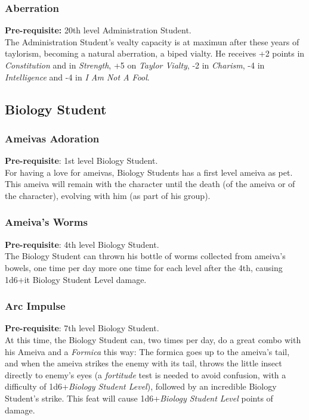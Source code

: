\documentclass[ letterpaper,12pt]{article}
\begin{document}
\subsubsection{Aberration}
 {\bf Pre-requisite:} 20th level Administration Student.\\
The Administration Student's vealty capacity is at maximun after these years of taylorism, becoming a natural aberration, a biped vialty. He receives +2 points in {\it Constitution} and in {\it Strength}, +5 on {\it Taylor Vialty}, -2 in {\it Charism}, -4 in {\it Intelligence} and -4 in {\it I Am Not A Fool}.

\subsection{Biology Student}

\subsubsection{Ameivas Adoration}
{\bf Pre-requisite}: 1st level Biology Student.\\
For having a love for ameivas, Biology Students has a first level ameiva as pet. This ameiva will remain with the character until the death (of the ameiva or of the character), evolving with him (as part of his group).

\subsubsection{Ameiva's Worms}
{\bf Pre-requisite}: 4th level Biology Student.\\
The Biology Student can thrown his bottle of worms collected from ameiva's bowels, one time per day more one time for each level after the 4th, causing 1d6+{it Biology Student Level} damage.

\subsubsection{Arc Impulse}
{\bf Pre-requisite}: 7th level Biology Student.\\
At this time, the Biology Student can, two times per day, do a great combo with his Ameiva and a {\it Formica} this way: The formica goes up to the ameiva's tail, and when the ameiva strikes the enemy with its tail, throws the little insect directly to enemy's eyes (a {\it fortitude} test is needed to avoid confusion, with a difficulty of 1d6+{\it Biology Student Level}), followed by an incredible Biology Student's strike. This feat will cause 1d6+{\it Biology Student Level} points of damage.
\end{document}
